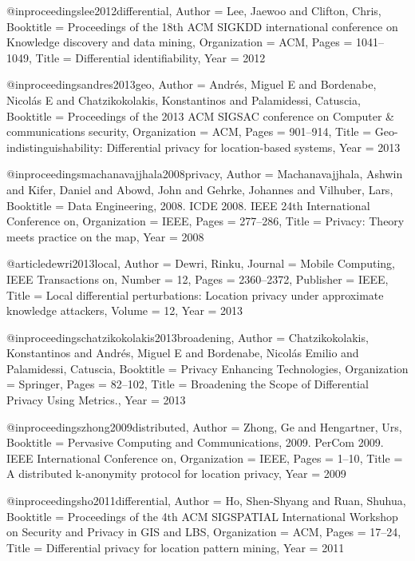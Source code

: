 {{{{{	@inproceedings{lee2012differential,
	Author = {Lee, Jaewoo and Clifton, Chris},
	Booktitle = {Proceedings of the 18th ACM SIGKDD international conference on Knowledge discovery and data mining},
	Organization = {ACM},
	Pages = {1041--1049},
	Title = {Differential identifiability},
	Year = {2012}}
	
	@inproceedings{andres2013geo,
	Author = {Andr{\'e}s, Miguel E and Bordenabe, Nicol{\'a}s E and Chatzikokolakis, Konstantinos and Palamidessi, Catuscia},
	Booktitle = {Proceedings of the 2013 ACM SIGSAC conference on Computer \& communications security},
	Organization = {ACM},
	Pages = {901--914},
	Title = {Geo-indistinguishability: Differential privacy for location-based systems},
	Year = {2013}}
	
	@inproceedings{machanavajjhala2008privacy,
	Author = {Machanavajjhala, Ashwin and Kifer, Daniel and Abowd, John and Gehrke, Johannes and Vilhuber, Lars},
	Booktitle = {Data Engineering, 2008. ICDE 2008. IEEE 24th International Conference on},
	Organization = {IEEE},
	Pages = {277--286},
	Title = {Privacy: Theory meets practice on the map},
	Year = {2008}}
	
	@article{dewri2013local,
	Author = {Dewri, Rinku},
	Journal = {Mobile Computing, IEEE Transactions on},
	Number = {12},
	Pages = {2360--2372},
	Publisher = {IEEE},
	Title = {Local differential perturbations: Location privacy under approximate knowledge attackers},
	Volume = {12},
	Year = {2013}}
	
	@inproceedings{chatzikokolakis2013broadening,
	Author = {Chatzikokolakis, Konstantinos and Andr{\'e}s, Miguel E and Bordenabe, Nicol{\'a}s Emilio and Palamidessi, Catuscia},
	Booktitle = {Privacy Enhancing Technologies},
	Organization = {Springer},
	Pages = {82--102},
	Title = {Broadening the Scope of Differential Privacy Using Metrics.},
	Year = {2013}}
	
	@inproceedings{zhong2009distributed,
	Author = {Zhong, Ge and Hengartner, Urs},
	Booktitle = {Pervasive Computing and Communications, 2009. PerCom 2009. IEEE International Conference on},
	Organization = {IEEE},
	Pages = {1--10},
	Title = {A distributed k-anonymity protocol for location privacy},
	Year = {2009}}
	
	@inproceedings{ho2011differential,
	Author = {Ho, Shen-Shyang and Ruan, Shuhua},
	Booktitle = {Proceedings of the 4th ACM SIGSPATIAL International Workshop on Security and Privacy in GIS and LBS},
	Organization = {ACM},
	Pages = {17--24},
	Title = {Differential privacy for location pattern mining},
	Year = {2011}}
	
}}}}}
